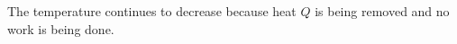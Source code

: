 The temperature continues to decrease because heat \( Q \) is being removed and no work is being done.